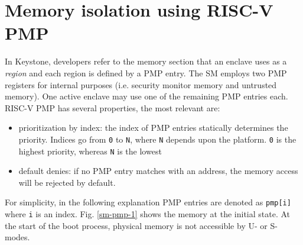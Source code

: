 \section{Memory isolation using RISC-V PMP}
In Keystone, developers refer to the memory section that an enclave uses as a \textit{region} and each region is defined by a PMP entry. The SM employs two PMP registers for internal purposes (i.e. security monitor memory and untrusted memory). One active enclave may use one of the remaining PMP entries each. RISC-V PMP has several properties, the most relevant are: 
\begin{itemize}
    \item prioritization by index: the index of PMP entries statically determines the priority. Indices go from \texttt{0} to \texttt{N}, where \texttt{N} depends upon the platform. \texttt{0} is the highest priority, whereas \texttt{N} is the lowest 
    \item default denies: if no PMP entry matches with an address, the memory access will be rejected by default.
\end{itemize}
For simplicity, in the following explanation PMP entries are denoted as \texttt{pmp[i]} where \texttt{i} is an index. Fig. \ref{sm-pmp-1} shows the memory at the initial state. At the start of the boot process, physical memory is not accessible by U- or S-modes. 

